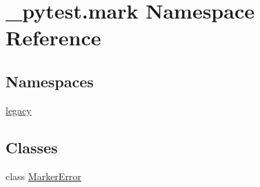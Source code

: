 \hypertarget{namespace__pytest_1_1mark}{}\section{\+\_\+pytest.\+mark Namespace Reference}
\label{namespace__pytest_1_1mark}
\subsection*{Namespaces}
\begin{DoxyCompactItemize}
\item 
 \hyperlink{namespace__pytest_1_1mark_1_1legacy}{legacy}
\end{DoxyCompactItemize}
\subsection*{Classes}
\begin{DoxyCompactItemize}
\item 
class \hyperlink{class__pytest_1_1mark_1_1_marker_error}{Marker\+Error}
\end{DoxyCompactItemize}
